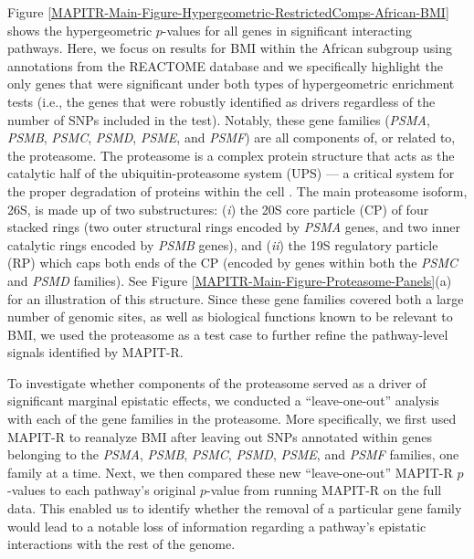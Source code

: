 \documentclass[10pt]{article}
\begin{document}
Figure \ref{MAPITR-Main-Figure-Hypergeometric-RestrictedComps-African-BMI} shows the hypergeometric $p$-values for all genes in significant interacting pathways. Here, we focus on results for BMI within the African subgroup using annotations from the REACTOME database and we specifically highlight the only genes that were significant under both types of hypergeometric enrichment tests (i.e., the genes that were robustly identified as drivers regardless of the number of SNPs included in the test). Notably, these gene families (\textit{PSMA}, \textit{PSMB}, \textit{PSMC}, \textit{PSMD}, \textit{PSME}, and \textit{PSMF}) are all components of, or related to, the proteasome. The proteasome is a complex protein structure that acts as the catalytic half of the ubiquitin-proteasome system (UPS) --- a critical system for the proper degradation of proteins within the cell \cite{Voges1999,Livneh2016,Collins2017}. The main proteasome isoform, 26S, is made up of two substructures: (\textit{i}) the 20S core particle (CP) of four stacked rings (two outer structural rings encoded by \textit{PSMA} genes, and two inner catalytic rings encoded by \textit{PSMB} genes), and (\textit{ii}) the 19S regulatory particle (RP) which caps both ends of the CP (encoded by genes within both the \textit{PSMC} and \textit{PSMD} families). See Figure \ref{MAPITR-Main-Figure-Proteasome-Panels}(a) for an illustration of this structure. Since these gene families covered both a large number of genomic sites, as well as biological functions known to be relevant to BMI, we used the proteasome as a test case to further refine the pathway-level signals identified by MAPIT-R.
 
To investigate whether components of the proteasome served as a driver of significant marginal epistatic effects, we conducted a ``leave-one-out'' analysis with each of the gene families in the proteasome. More specifically, we first used MAPIT-R to reanalyze BMI after leaving out SNPs annotated within genes belonging to the \textit{PSMA}, \textit{PSMB}, \textit{PSMC}, \textit{PSMD}, \textit{PSME}, and \textit{PSMF} families, one family at a time. Next, we then compared these new ``leave-one-out'' MAPIT-R $p$-values to each pathway's original $p$-value from running MAPIT-R on the full data. This enabled us to identify whether the removal of a particular gene family would lead to a notable loss of information regarding a pathway's epistatic interactions with the rest of the genome. 
 
\end{document}
